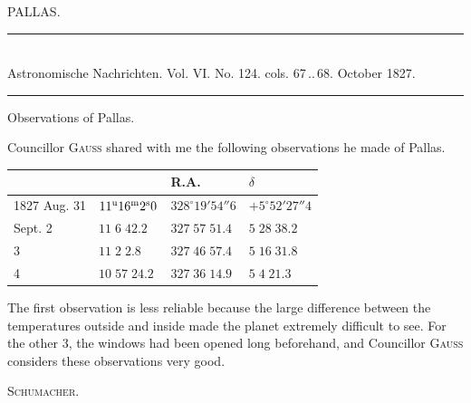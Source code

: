 \clearpage
{}
\hypertarget{native-465-pallas}{}
\begin{center}{\large PALLAS.}\end{center}

\begin{center}
\rule{0.55\linewidth}{0.4pt}\\[2pt]
Astronomische Nachrichten. Vol. VI. No. 124. cols. 67\,..\,68. October 1827.\\[2pt]
\rule{0.55\linewidth}{0.4pt}
\end{center}

\begin{center}Observations of Pallas.\end{center}

Councillor \textsc{Gauss} shared with me the following observations he made of Pallas.

\begin{center}
\begin{tabular}{l|l|l|l}
 & & R.A. & $\delta$ \\
\hline
1827 Aug. 31 & $11^{\rm u}16^{\rm m}2^{\rm s}0$ & $328^\circ19'54''6$ & $+5^\circ52'27''4$ \\
\hfill Sept. 2 & $11\;6\;42.2$ & $327\;57\;51.4$ & $5\;28\;38.2$ \\
\hfill 3 & $11\;2\;2.8$ & $327\;46\;57.4$ & $5\;16\;31.8$ \\
\hfill 4 & $10\;57\;24.2$ & $327\;36\;14.9$ & $5\;4\;21.3$ \\
\end{tabular}
\end{center}

The first observation is less reliable because the large difference between the temperatures outside and inside made the planet extremely difficult to see. For the other 3, the windows had been opened long beforehand, and Councillor \textsc{Gauss} considers these observations very good.
\begin{flushright}\textsc{Schumacher.}\end{flushright}

